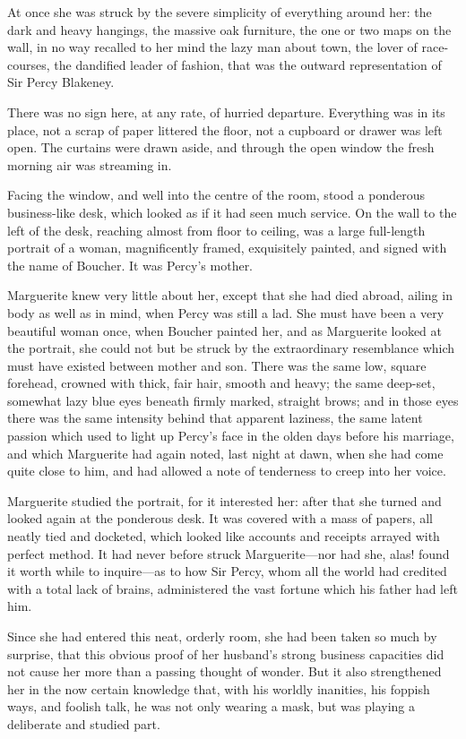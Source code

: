 At once she was struck by the severe simplicity of everything around her: the dark and heavy hangings, the massive oak furniture, the one or two maps on the wall, in no way recalled to her mind the lazy man about town, the lover of race-courses, the dandified leader of fashion, that was the outward representation of Sir Percy Blakeney.

There was no sign here, at any rate, of hurried departure. Every\-thing was in its place, not a scrap of paper littered the floor, not a cupboard or drawer was left open. The curtains were drawn aside, and through the open window the fresh morning air was streaming in.

Facing the window, and well into the centre of the room, stood a ponderous business-like desk, which looked as if it had seen much service. On the wall to the left of the desk, reaching almost from floor to ceiling, was a large full-length portrait of a woman, magnificently framed, exquisitely painted, and signed with the name of Boucher. It was Percy's mother.

Marguerite knew very little about her, except that she had died abroad, ailing in body as well as in mind, when Percy was still a lad. She must have been a very beautiful woman once, when Boucher painted her, and as Marguerite looked at the portrait, she could not but be struck by the extraordinary resemblance which must have existed between mother and son. There was the same low, square forehead, crowned with thick, fair hair, smooth and heavy; the same deep-set, somewhat lazy blue eyes beneath firmly marked, straight brows; and in those eyes there was the same intensity behind that apparent laziness, the same latent passion which used to light up Percy's face in the olden days before his marriage, and which Marguerite had again noted, last night at dawn, when she had come quite close to him, and had allowed a note of tenderness to creep into her voice.

Marguerite studied the portrait, for it interested her: after that she turned and looked again at the ponderous desk. It was covered with a mass of papers, all neatly tied and docketed, which looked like accounts and receipts arrayed with perfect method. It had never before struck Marguerite—nor had she, alas! found it worth while to inquire—as to how Sir Percy, whom all the world had credited with a total lack of brains, administered the vast fortune which his father had left him.

Since she had entered this neat, orderly room, she had been taken so much by surprise, that this obvious proof of her husband's strong business capacities did not cause her more than a passing thought of wonder. But it also strengthened her in the now certain knowledge that, with his worldly inanities, his foppish ways, and foolish talk, he was not only wearing a mask, but was playing a deliberate and studied part.

